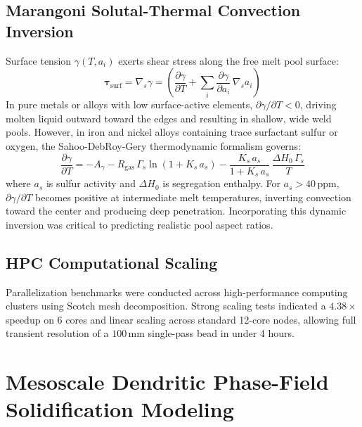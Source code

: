 \documentclass[10pt,a4paper]{article}
\begin{document}
\subsection{Marangoni Solutal-Thermal Convection Inversion}
Surface tension \(\gamma(T, a_i)\) exerts shear stress along the free melt pool surface:
\[
\boldsymbol{\tau}_{\mathrm{surf}} = \nabla_s \gamma = \left(\frac{\partial \gamma}{\partial T} + \sum_i \frac{\partial \gamma}{\partial a_i}\,\nabla_s a_i\right)
\]
In pure metals or alloys with low surface-active elements, \(\partial\gamma/\partial T < 0\), driving molten liquid outward toward the edges and resulting in shallow, wide weld pools. However, in iron and nickel alloys containing trace surfactant sulfur or oxygen, the Sahoo-DebRoy-Gery thermodynamic formalism governs:
\[
\frac{\partial \gamma}{\partial T} = -A_{\gamma} - R_{\mathrm{gas}}\,\Gamma_s \ln\left(1 + K_s\,a_s\right) - \frac{K_s\,a_s}{1 + K_s\,a_s}\,\frac{\Delta H_0\,\Gamma_s}{T}
\]
where \(a_s\) is sulfur activity and \(\Delta H_0\) is segregation enthalpy. For \(a_s > 40\,\mathrm{ppm}\), \(\partial\gamma/\partial T\) becomes positive at intermediate melt temperatures, inverting convection toward the center and producing deep penetration. Incorporating this dynamic inversion was critical to predicting realistic pool aspect ratios.

\subsection{HPC Computational Scaling}
Parallelization benchmarks were conducted across high-performance computing clusters using Scotch mesh decomposition. Strong scaling tests indicated a \(4.38\times\) speedup on 6 cores and linear scaling across standard 12-core nodes, allowing full transient resolution of a \(100\,\mathrm{mm}\) single-pass bead in under 4 hours.

\section{Mesoscale Dendritic Phase-Field Solidification Modeling}
\end{document}
